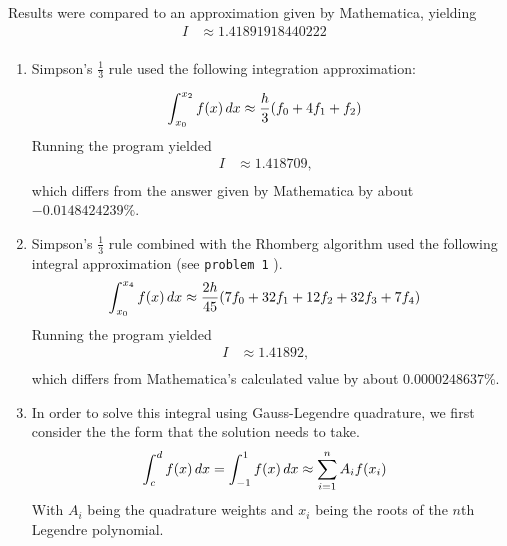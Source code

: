 \documentclass[12pt]{article}
\DeclarePairedDelimiter\rb{(}{)}
\begin{document}
Results were compared to an approximation given by Mathematica, yielding 
\begin{align*}
    I & \approx  \!1.41891918440222 &\\
\end{align*}

\begin{enumerate}[label=(\alph*)]
    \item Simpson's \(\frac{1}{3}\) rule used the following integration approximation:

        \begin{align*}
            \int_{x_{0}}^{x_{2}} {f \rb*{x}} \,d x & \approx
            \frac{h}{3} \rb*{f_{0} + 4 f_{1} + f_{2}}  &\\
        \end{align*}
Running the program yielded
\begin{align*}
    I & \approx 1.418709 ,&\\
\end{align*}
which differs from the answer given by Mathematica by about \(-0.0148424239 \%\).

    \item Simpson's \(\frac{1}{3}\) rule combined with the Rhomberg algorithm used the following integral approximation (see \texttt{problem 1} ).
        \begin{align*}
            \int_{x_{0}}^{x_{4}} {f \rb*{x}} \,d x & \approx
            \frac{2 h }{45} \rb*{ 7 f_{0} + 32 f_{1} + 12 f_{2} + 32 f_{3} + 7 f_{4}} &\\
        \end{align*}
        Running the program yielded
        \begin{align*}
            I & \approx 1.41892 ,&\\
        \end{align*}
        which differs from Mathematica's calculated value by about \(0.0000248637 \%\).
    \item In order to solve this integral using Gauss-Legendre quadrature, we first consider the the form that the solution needs to take. 
    \begin{align*}
        \int_{c}^{d} {f \rb*{x}} \,d x & = 
        \int_{-1}^{1} { f \rb*{x}} \,d x  \approx
        \sum_{i = 1}^{n} {A_{i} f \rb*{x_{i}}}  &\\
    \end{align*}
    With \(A_{i}\) being the quadrature weights and \(x_{i}\) being the roots of the \(n\)th Legendre polynomial.


\end{enumerate}
\end{document}
